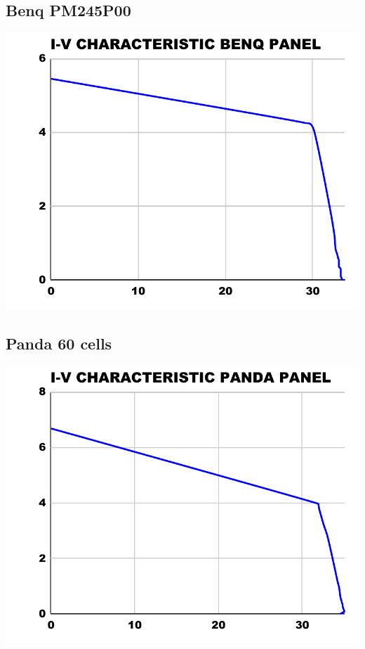 \documentclass[12pt]{article}
\begin{document}
\subsection{Benq PM245P00}
\includegraphics[scale=0.5]{benq-iv.pdf}
\subsection{Panda 60 cells}
\includegraphics[scale=0.5]{panda-iv.pdf}
\end{document}
